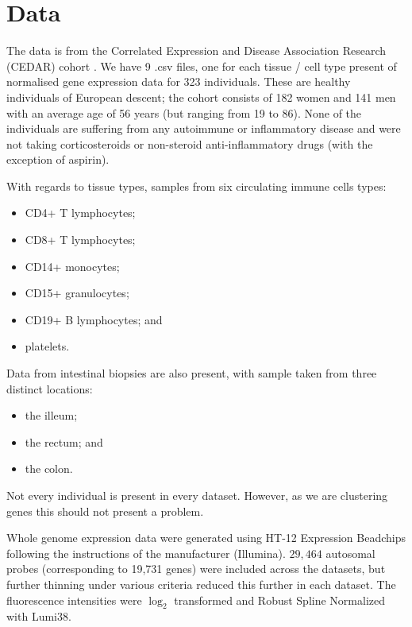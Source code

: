 \documentclass[12pt]{article} %
\begin{document}
	

	

	\section{Data}	
	The data is from the Correlated Expression and Disease Association Research (CEDAR) cohort \cite{the_international_ibd_genetics_consortium_ibd_2018}. We have 9 .csv files, one for each tissue / cell type present of normalised gene expression data for 323 individuals. These are healthy individuals of European descent; the cohort consists of 182 women and 141 men with an average age of 56 years (but ranging from 19 to 86). None of the individuals are suffering from any autoimmune or inflammatory disease and were not taking corticosteroids or non-steroid anti-inflammatory drugs (with the exception of aspirin). 
	
	With regards to tissue types, samples from six circulating immune cells types:
	\begin{itemize}
		\item CD4+ T lymphocytes;
		\item CD8+ T lymphocytes;
		\item CD14+ monocytes;
		\item CD15+ granulocytes;
		\item CD19+ B lymphocytes; and 
		\item platelets.
	\end{itemize}
	Data from intestinal biopsies are also present, with sample taken from three distinct locations:
	\begin{itemize}
		\item the illeum;
		\item the rectum; and
		\item the colon.
	\end{itemize} 
	Not every individual is present in every dataset. However, as we are clustering genes this should not present a problem.
	
	Whole genome expression data were generated using HT-12 Expression Beadchips following the instructions of the manufacturer (Illumina). $29,464$ autosomal probes (corresponding to 19,731 genes) were included across the datasets, but further thinning under various criteria reduced this further in each dataset. The fluorescence intensities were $\log_2$ transformed and Robust Spline Normalized with Lumi38.
	
\end{document}
